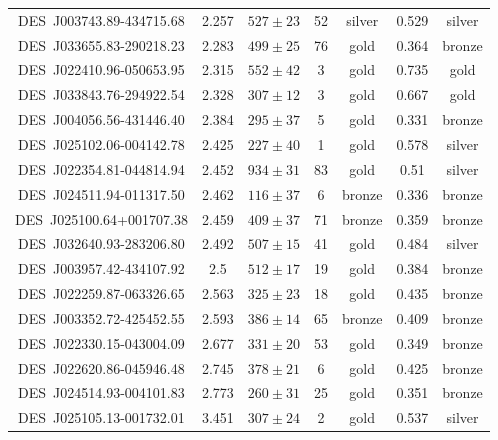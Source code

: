 \documentclass[11pt]{article}
\begin{document}
\begin{table}[htbp]
{\begin{tabular}{ccccccc}
DES~J003743.89-434715.68 & 2.257 & $527 \pm 23$ & 52 & silver & 0.529 & silver\\
DES~J033655.83-290218.23 & 2.283 & $499 \pm 25$ & 76 & gold & 0.364 & bronze\\
DES~J022410.96-050653.95 & 2.315 & $552 \pm 42$ & 3 & gold & 0.735 & gold\\
DES~J033843.76-294922.54 & 2.328 & $307 \pm 12$ & 3 & gold & 0.667 & gold\\
DES~J004056.56-431446.40 & 2.384 & $295 \pm 37$ & 5 & gold & 0.331 & bronze\\
DES~J025102.06-004142.78 & 2.425 & $227 \pm 40$ & 1 & gold & 0.578 & silver\\
DES~J022354.81-044814.94 & 2.452 & $934 \pm 31$ & 83 & gold & 0.51 & silver\\
DES~J024511.94-011317.50 & 2.462 & $116 \pm 37$ & 6 & bronze & 0.336 & bronze\\
DES~J025100.64+001707.38 & 2.459 & $409 \pm 37$ & 71 & bronze & 0.359 & bronze\\
DES~J032640.93-283206.80 & 2.492 & $507 \pm 15$ & 41 & gold & 0.484 & silver\\
DES~J003957.42-434107.92 & 2.5 & $512 \pm 17$ & 19 & gold & 0.384 & bronze\\
DES~J022259.87-063326.65 & 2.563 & $325 \pm 23$ & 18 & gold & 0.435 & bronze\\
DES~J003352.72-425452.55 & 2.593 & $386 \pm 14$ & 65 & bronze & 0.409 & bronze\\
DES~J022330.15-043004.09 & 2.677 & $331 \pm 20$ & 53 & gold & 0.349 & bronze\\
DES~J022620.86-045946.48 & 2.745 & $378 \pm 21$ & 6 & gold & 0.425 & bronze\\
DES~J024514.93-004101.83 & 2.773 & $260 \pm 31$ & 25 & gold & 0.351 & bronze\\
DES~J025105.13-001732.01 & 3.451 & $307 \pm 24$ & 2 & gold & 0.537 & silver\\ \hline                                     
\end{tabular}
}
\end{table}
\end{document}
